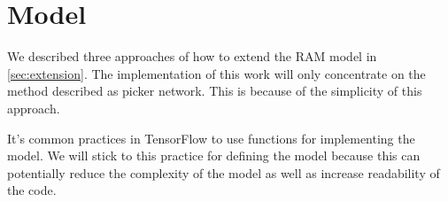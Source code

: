 
%
%


\section{Model}
\label{sec:design_model}

We described three approaches of how to extend the RAM model
in \autoref{sec:extension}. The implementation of this work
will only concentrate on the method described as picker network.
This is because of the simplicity of this approach.


It's common practices in TensorFlow to use functions for implementing the model.
We will stick to this practice for defining the model because this can
potentially reduce the complexity of the model as well as
increase readability of the code.


